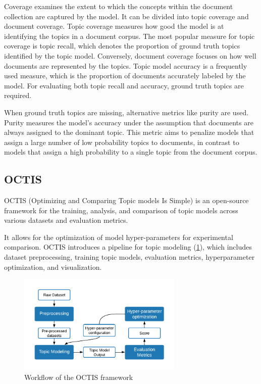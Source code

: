 Coverage examines the extent to which the concepts within the document collection are captured by the model. It can be divided into topic coverage and document coverage. Topic coverage measures how good the model is at identifying the topics in a document corpus. The most popular measure for topic coverage is topic recall, which denotes the proportion of ground truth topics identified by the topic model. Conversely, document coverage focuses on how well documents are represented by the topics. Topic model accuracy is a frequently used measure, which is the proportion of documents accurately labeled by the model. For evaluating both topic recall and accuracy, ground truth topics are required.

When ground truth topics are missing, alternative metrics like purity are used. Purity measures the model's accuracy under the assumption that documents are always assigned to the dominant topic. This metric aims to penalize models that assign a large number of low probability topics to documents, in contrast to models that assign a high probability to a single topic from the document corpus.

\subsection{OCTIS}
\label{sec:octis}
OCTIS (Optimizing and Comparing Topic models Is Simple) \cite{terragni_octis_2021} is an open-source framework for the training, analysis, and comparison of topic models across various datasets and evaluation metrics.

It allows for the optimization of model hyper-parameters for experimental comparison. OCTIS introduces a pipeline for topic modeling (\cref{fig:octis}), which includes dataset preprocessing, training topic models, evaluation metrics, hyperparameter optimization, and visualization.

\begin{figure}[h] %
    \centering
    \includegraphics[width=0.7\textwidth]{figures/octis.pdf}
    \caption{Workflow of the OCTIS framework}
    \label{fig:octis}
\end{figure}

